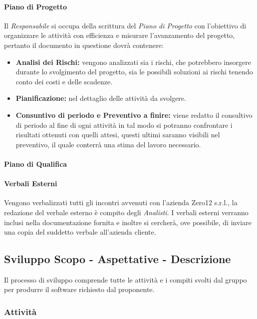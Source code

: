 \paragraph{Piano di Progetto}
Il \textit{Responsabile} si occupa della scrittura del \textit{Piano di Progetto} con l'obiettivo di organizzare le attività con efficienza e misurare l'avanzamento del progetto, pertanto il documento in questione dovrà contenere:
\begin{itemize}
	\item \textbf{Analisi dei Rischi:} vengono analizzati sia i rischi, che potrebbero insorgere durante lo svolgimento del progetto, sia le possibili soluzioni ai rischi tenendo conto dei costi e delle scadenze.
	\item \textbf{Pianificazione:} nel dettaglio delle attività da svolgere.
	\item \textbf{Consuntivo di periodo e Preventivo a finire:} viene redatto il consultivo di periodo al fine di ogni attività in tal modo si potranno confrontare i risultati ottenuti con quelli attesi, questi ultimi saranno visibili nel preventivo, il quale conterrà una stima del lavoro necessario.
\end{itemize}

\paragraph{Piano di Qualifica}


\paragraph{Verbali Esterni}
Vengono verbalizzati tutti gli incontri avvenuti con l'azienda Zero12 s.r.l., la redazione del verbale esterno è compito degli \textit{Analisti}. I verbali esterni verranno inclusi nella documentazione fornita e inoltre si cercherà, ove possibile, di inviare una copia del suddetto verbale all'azienda cliente.

\subsection{Sviluppo Scopo - Aspettative - Descrizione}
Il processo di sviluppo comprende tutte le attività e i compiti svolti dal gruppo per produrre il software richiesto dal proponente.

\subsubsection{Attività}
